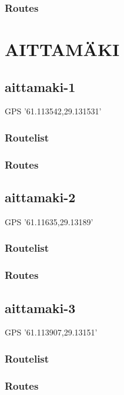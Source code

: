 \documentclass[8pt, a5paper,notitlepage,openany]{report}
\begin{document}
\subsection{Routes}
  



\chapter{AITTAMÄKI}
\section{aittamaki-1}
 GPS '61.113542,29.131531'
\subsection{Routelist}

\newpage
\subsection{Routes}


\clearpage 
\section{aittamaki-2}
 GPS '61.11635,29.13189'
\subsection{Routelist}


\newpage
\subsection{Routes}


 
\clearpage 
\section{aittamaki-3}
  GPS '61.113907,29.13151'
\subsection{Routelist}

\newpage
\subsection{Routes}
\end{document}
